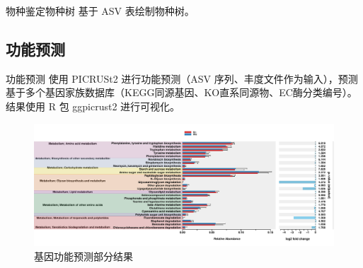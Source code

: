 \documentclass[UTF8]{ctexbeamer}
\begin{document}
	\begin{frame}{物种鉴定}{物种树}
		\qquad 基于 ASV 表绘制物种树。

		\begin{figure}
		\end{figure}

	\end{frame}


	\subsection{功能预测}
	\begin{frame}{功能预测}
		\qquad 使用 PICRUSt2 进行功能预测（ASV 序列、丰度文件作为输入），预测基于多个基因家族数据库（KEGG同源基因、KO直系同源物、EC酶分类编号）。结果使用 R 包 ggpicrust2 进行可视化。
		\begin{figure}
			\centering
			\includegraphics[width=\textwidth]{img/RelativeAbundance60.pdf}
			\caption{基因功能预测部分结果}
		\end{figure}
	
	\end{frame}
\end{document}
